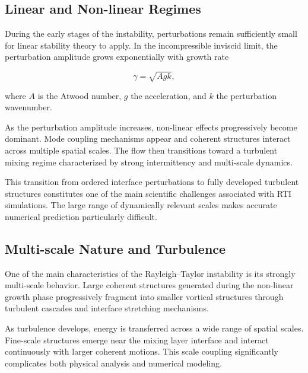 \subsection{Linear and Non-linear Regimes}

During the early stages of the instability, perturbations remain sufficiently small for linear stability theory to apply. In the incompressible inviscid limit, the perturbation amplitude grows exponentially with growth rate~\citep[p.~23]{zhou2017rti1}

\[
\gamma = \sqrt{A g k},
\]

where $A$ is the Atwood number, $g$ the acceleration, and $k$ the perturbation wavenumber.

As the perturbation amplitude increases, non-linear effects progressively become dominant. Mode coupling mechanisms appear and coherent structures interact across multiple spatial scales. The flow then transitions toward a turbulent mixing regime characterized by strong intermittency and multi-scale dynamics.


This transition from ordered interface perturbations to fully developed turbulent structures constitutes one of the main scientific challenges associated with RTI simulations. The large range of dynamically relevant scales makes accurate numerical prediction particularly difficult.

\subsection{Multi-scale Nature and Turbulence}

One of the main characteristics of the Rayleigh--Taylor instability is its strongly multi-scale behavior. Large coherent structures generated during the non-linear growth phase progressively fragment into smaller vortical structures through turbulent cascades and interface stretching mechanisms.

As turbulence develops, energy is transferred across a wide range of spatial scales. Fine-scale structures emerge near the mixing layer interface and interact continuously with larger coherent motions. This scale coupling significantly complicates both physical analysis and numerical modeling.


